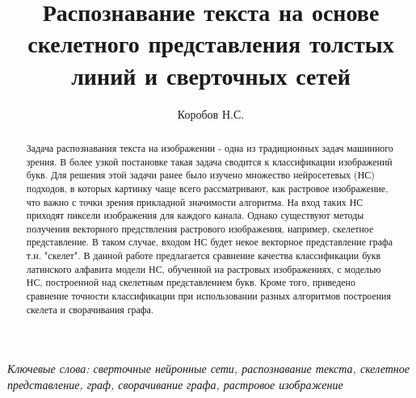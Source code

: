 \documentclass{llncs}
\title{Распознавание текста на основе скелетного представления толстых линий и сверточных сетей }
\author{Коробов Н.С.}
\institute{Московский физико-технический институт (Государственный университет) \\ \email{korobov.ns@phystech.edu}}
\begin{document}
\maketitle

\begin{abstract}
Задача распознавания текста на изображении - одна из традиционных задач машинного зрения. В более узкой постановке такая задача сводится к классификации изображений букв. Для решения этой задачи ранее было изучено множество нейросетевых (НС) подходов, в которых картинку чаще всего рассматривают, как растровое изображение, что важно с точки зрения прикладной значимости алгоритма. На вход таких НС приходят пиксели изображения для каждого канала. Однако существуют методы получения векторного предствления растрового изображения, например, скелетное представление. В таком случае, входом НС будет некое векторное представление графа т.н. "скелет".
В данной работе предлагается сравнение качества классификации букв латинского алфавита модели НС, обученной на растровых изображениях, с моделью НС, построенной над скелетным представлением букв. Кроме того, приведено сравнение точности классификации при использовании разных алгоритмов построения скелета и сворачивания графа.
\end{abstract}

\textit{Ключевые слова: сверточные нейронные сети, распознавание текста, скелетное представление, граф, сворачивание графа, растровое изображение}
\end{document}
